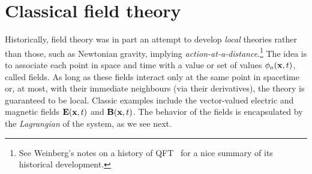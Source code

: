 






\section{Classical field theory}
\label{sec:01_qft_classical}

Historically, field theory was in part an attempt to develop \textit{local} theories rather than those, such as Newtonian gravity, implying \textit{action-at-a-distance}.\footnote{See Weinberg's notes on a history of QFT~\cite{WeinbergHistoryQFT} for a nice summary of its historical development.}
The idea is to associate each point in space and time with a value or set of values $\phi_a(\mathbf{x}, t)$, called fields.
As long as these fields interact only at the same point in spacetime or, at most, with their immediate neighbours (via their derivatives), the theory is guaranteed to be local.
Classic examples include the vector-valued electric and magnetic fields $\mathbf{E}(\mathbf{x}, t)$ and $\mathbf{B}(\mathbf{x}, t)$.
The behavior of the fields is encapsulated by the \textit{Lagrangian} of the system, as we see next.

